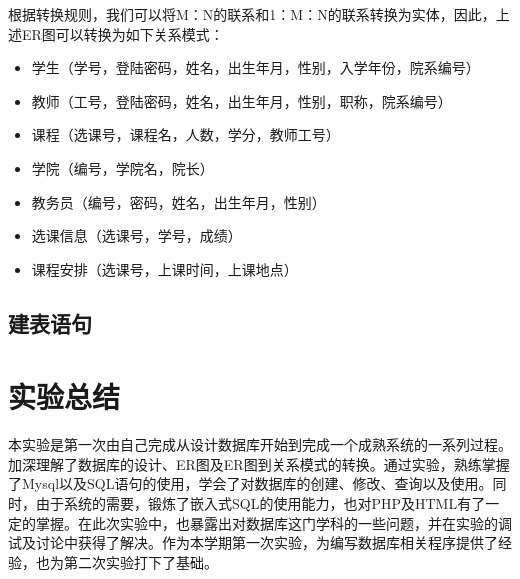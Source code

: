\documentclass[a4paper, 11pt, nofonts, nocap, fancyhdr]{ctexart}
\begin{document}
根据转换规则，我们可以将M：N的联系和1：M：N的联系转换为实体，因此，上述ER图可以转换为如下关系模式：
\begin{itemize}
    \item 学生（学号，登陆密码，姓名，出生年月，性别，入学年份，院系编号）
    \item 教师（工号，登陆密码，姓名，出生年月，性别，职称，院系编号）
    \item 课程（选课号，课程名，人数，学分，教师工号）
    \item 学院（编号，学院名，院长）
    \item 教务员（编号，密码，姓名，出生年月，性别）
    \item 选课信息（选课号，学号，成绩）
    \item 课程安排（选课号，上课时间，上课地点）
\end{itemize}

\subsection{建表语句}



\section{实验总结}

本实验是第一次由自己完成从设计数据库开始到完成一个成熟系统的一系列过程。加深理解了数据库的设计、ER图及ER图到关系模式的转换。通过实验，熟练掌握了Mysql以及SQL语句的使用，学会了对数据库的创建、修改、查询以及使用。同时，由于系统的需要，锻炼了嵌入式SQL的使用能力，也对PHP及HTML有了一定的掌握。在此次实验中，也暴露出对数据库这门学科的一些问题，并在实验的调试及讨论中获得了解决。作为本学期第一次实验，为编写数据库相关程序提供了经验，也为第二次实验打下了基础。
\end{document}
